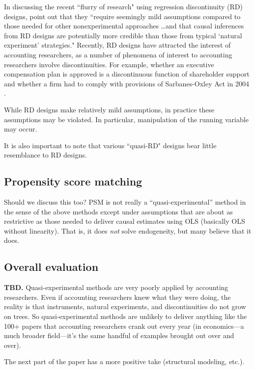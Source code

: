 In discussing the recent ``flurry of research" using regression discontinuity (RD) designs, \citet[p.282]{Lee:2010hya} point out that they ``require seemingly mild assumptions compared to those needed for other nonexperimental approaches \dots and that causal inferences from RD designs are potentially more credible than those from typical `natural experiment' strategies." 
Recently, RD designs have attracted the interest of accounting researchers, as a number of phenomena of interest to accounting researchers involve discontinuities. For example, whether an executive compensation plan is approved is a discontinuous function of shareholder support \citet{Armstrong:2013io} and whether a firm had to comply with provisions of Sarbanes-Oxley Act in 2004 \citep{Iliev:2010ic}.

While RD designs make relatively mild assumptions, in practice these assumptions may be violated. In particular, manipulation of the running variable may occur.

It is also important to note that various ``quasi-RD" designs bear little resemblance to RD designs.

\subsection{Propensity score matching}

Should we discuss this too? PSM is not really a ``quasi-experimental'' method in the sense of the above methods except under assumptions that are about as restrictive as those needed to deliver causal estimates using OLS (basically OLS without linearity). That is, it does \emph{not} solve endogeneity, but many believe that it does.

\subsection{Overall evaluation} 
\textbf{TBD.} Quasi-experimental methods are very poorly applied by accounting researchers. Even if accounting researchers knew what they were doing, the reality is that instruments, natural experiments, and discontinuities do not grow on trees. So quasi-experimental methods are unlikely to deliver anything like the 100+ papers that accounting researchers crank out every year (in economics---a much broader field---it's the same handful of examples brought out over and over).

The next part of the paper has a more positive take (structural modeling, etc.).

